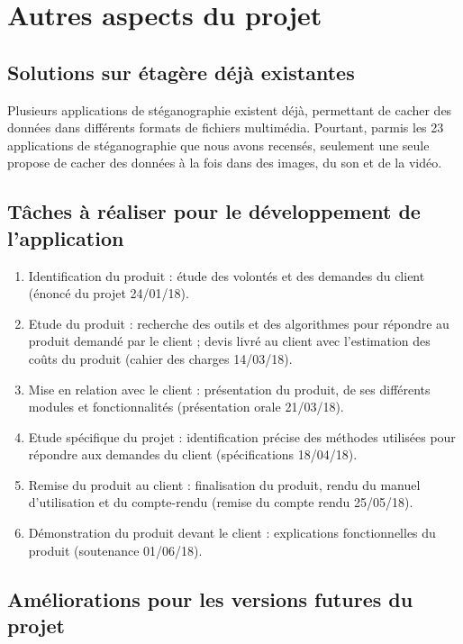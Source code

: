 \documentclass[11pt]{article}
\begin{document}
\section{Autres aspects du projet}

\subsection{Solutions sur étagère déjà existantes}

Plusieurs applications de stéganographie existent déjà, permettant de cacher des
données dans différents formats de fichiers multimédia. Pourtant, parmis les 23
applications de stéganographie que nous avons recensés, seulement une seule
propose de cacher des données à la fois dans des images, du son et de la vidéo.

\subsection{Tâches à réaliser pour le développement de l'application}

\begin {enumerate}
\item Identification du produit : étude des volontés et des demandes du client
    (énoncé du projet 24/01/18).
\item Etude du produit : recherche des outils et des algorithmes pour répondre
    au produit demandé par le client ; devis livré au client avec l'estimation
    des coûts du produit (cahier des charges 14/03/18).
\item Mise en relation avec le client : présentation du produit, de ses
    différents modules et fonctionnalités (présentation orale 21/03/18).
\item Etude spécifique du projet : identification précise des méthodes utilisées
    pour répondre aux demandes du client (spécifications 18/04/18).
\item Remise du produit au client : finalisation du produit, rendu du manuel
    d'utilisation et du compte-rendu (remise du compte rendu 25/05/18).
\item Démonstration du produit devant le client : explications fonctionnelles du
    produit (soutenance 01/06/18).
\end{enumerate}

\subsection{Améliorations pour les versions futures du projet}
\end{document}
